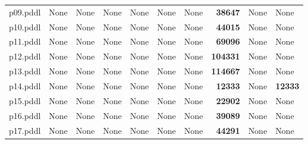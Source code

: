 \documentclass{article}
\begin{document}
\begin{tabular}{@{}lrrrrrrrrr@{}}
p09.pddl & \multicolumn{1}{|l|}{None} & \multicolumn{1}{|l|}{None} & \multicolumn{1}{|l|}{None} & \multicolumn{1}{|l|}{None} & \multicolumn{1}{|l|}{None} & \multicolumn{1}{|l|}{None} & \textbf{38647} & \multicolumn{1}{|l|}{None} & \multicolumn{1}{|l|}{None} \\
p10.pddl & \multicolumn{1}{|l|}{None} & \multicolumn{1}{|l|}{None} & \multicolumn{1}{|l|}{None} & \multicolumn{1}{|l|}{None} & \multicolumn{1}{|l|}{None} & \multicolumn{1}{|l|}{None} & \textbf{44015} & \multicolumn{1}{|l|}{None} & \multicolumn{1}{|l|}{None} \\
p11.pddl & \multicolumn{1}{|l|}{None} & \multicolumn{1}{|l|}{None} & \multicolumn{1}{|l|}{None} & \multicolumn{1}{|l|}{None} & \multicolumn{1}{|l|}{None} & \multicolumn{1}{|l|}{None} & \textbf{69096} & \multicolumn{1}{|l|}{None} & \multicolumn{1}{|l|}{None} \\
p12.pddl & \multicolumn{1}{|l|}{None} & \multicolumn{1}{|l|}{None} & \multicolumn{1}{|l|}{None} & \multicolumn{1}{|l|}{None} & \multicolumn{1}{|l|}{None} & \multicolumn{1}{|l|}{None} & \textbf{104331} & \multicolumn{1}{|l|}{None} & \multicolumn{1}{|l|}{None} \\
p13.pddl & \multicolumn{1}{|l|}{None} & \multicolumn{1}{|l|}{None} & \multicolumn{1}{|l|}{None} & \multicolumn{1}{|l|}{None} & \multicolumn{1}{|l|}{None} & \multicolumn{1}{|l|}{None} & \textbf{114667} & \multicolumn{1}{|l|}{None} & \multicolumn{1}{|l|}{None} \\
p14.pddl & \multicolumn{1}{|l|}{None} & \multicolumn{1}{|l|}{None} & \multicolumn{1}{|l|}{None} & \multicolumn{1}{|l|}{None} & \multicolumn{1}{|l|}{None} & \multicolumn{1}{|l|}{None} & \textbf{12333} & \multicolumn{1}{|l|}{None} & \textbf{12333} \\
p15.pddl & \multicolumn{1}{|l|}{None} & \multicolumn{1}{|l|}{None} & \multicolumn{1}{|l|}{None} & \multicolumn{1}{|l|}{None} & \multicolumn{1}{|l|}{None} & \multicolumn{1}{|l|}{None} & \textbf{22902} & \multicolumn{1}{|l|}{None} & \multicolumn{1}{|l|}{None} \\
p16.pddl & \multicolumn{1}{|l|}{None} & \multicolumn{1}{|l|}{None} & \multicolumn{1}{|l|}{None} & \multicolumn{1}{|l|}{None} & \multicolumn{1}{|l|}{None} & \multicolumn{1}{|l|}{None} & \textbf{39089} & \multicolumn{1}{|l|}{None} & \multicolumn{1}{|l|}{None} \\
p17.pddl & \multicolumn{1}{|l|}{None} & \multicolumn{1}{|l|}{None} & \multicolumn{1}{|l|}{None} & \multicolumn{1}{|l|}{None} & \multicolumn{1}{|l|}{None} & \multicolumn{1}{|l|}{None} & \textbf{44291} & \multicolumn{1}{|l|}{None} & \multicolumn{1}{|l|}{None} \\

\end{tabular}
\end{document}
